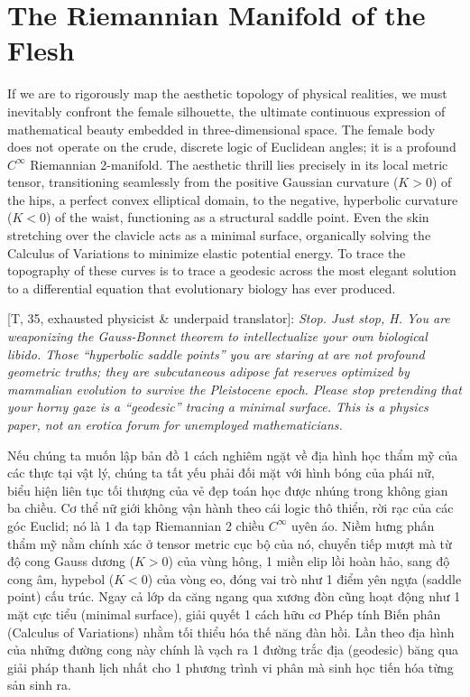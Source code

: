 \documentclass[11pt]{article}
\begin{document}

\section{The Riemannian Manifold of the Flesh}
If we are to rigorously map the aesthetic topology of physical realities, we must inevitably confront the female silhouette, the ultimate continuous expression of mathematical beauty embedded in three-dimensional space. The female body does not operate on the crude, discrete logic of Euclidean angles; it is a profound $C^\infty$ Riemannian 2-manifold. The aesthetic thrill lies precisely in its local metric tensor, transitioning seamlessly from the positive Gaussian curvature ($K > 0$) of the hips, a perfect convex elliptical domain, to the negative, hyperbolic curvature ($K < 0$) of the waist, functioning as a structural saddle point. Even the skin stretching over the clavicle acts as a minimal surface, organically solving the Calculus of Variations to minimize elastic potential energy. To trace the topography of these curves is to trace a geodesic across the most elegant solution to a differential equation that evolutionary biology has ever produced.

\vspace{2mm}
\textsf{[T, 35, exhausted physicist \& underpaid translator]:} \textit{Stop. Just stop, H. You are weaponizing the Gauss-Bonnet theorem to intellectualize your own biological libido. Those ``hyperbolic saddle points'' you are staring at are not profound geometric truths; they are subcutaneous adipose fat reserves optimized by mammalian evolution to survive the Pleistocene epoch. Please stop pretending that your horny gaze is a ``geodesic'' tracing a minimal surface. This is a physics paper, not an erotica forum for unemployed mathematicians.}
\vspace{2mm}

Nếu chúng ta muốn lập bản đồ 1 cách nghiêm ngặt về địa hình học thẩm mỹ của các thực tại vật lý, chúng ta tất yếu phải đối mặt với hình bóng của phái nữ, biểu hiện liên tục tối thượng của vẻ đẹp toán học được nhúng trong không gian ba chiều. Cơ thể nữ giới không vận hành theo cái logic thô thiển, rời rạc của các góc Euclid; nó là 1 đa tạp Riemannian 2 chiều $C^\infty$ uyên áo. Niềm hưng phấn thẩm mỹ nằm chính xác ở tensor metric cục bộ của nó, chuyển tiếp mượt mà từ độ cong Gauss dương ($K > 0$) của vùng hông, 1 miền elip lồi hoàn hảo, sang độ cong âm, hypebol ($K < 0$) của vòng eo, đóng vai trò như 1 điểm yên ngựa (saddle point) cấu trúc. Ngay cả lớp da căng ngang qua xương đòn cũng hoạt động như 1 mặt cực tiểu (minimal surface), giải quyết 1 cách hữu cơ Phép tính Biến phân (Calculus of Variations) nhằm tối thiểu hóa thế năng đàn hồi. Lần theo địa hình của những đường cong này chính là vạch ra 1 đường trắc địa (geodesic) băng qua giải pháp thanh lịch nhất cho 1 phương trình vi phân mà sinh học tiến hóa từng sản sinh ra.
\end{document}
